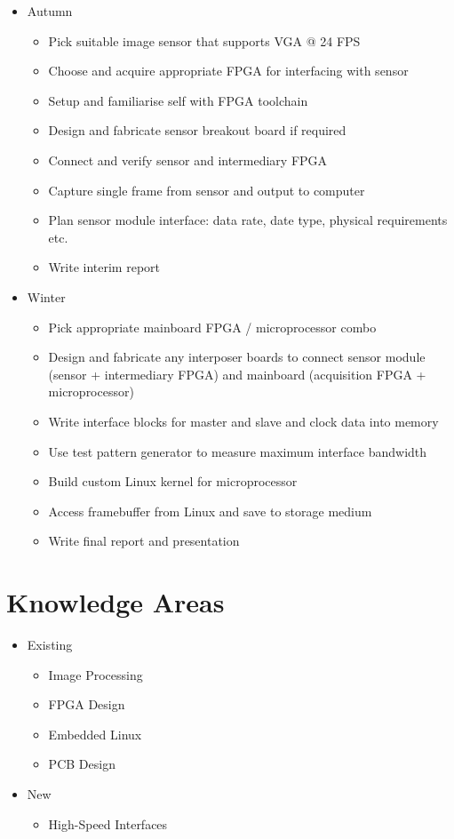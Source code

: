 \documentclass[a4paper]{article}
\begin{document}
\begin{itemize}
    \item Autumn
    \begin{itemize}
        \item Pick suitable image sensor that supports VGA @ 24 FPS
        \item Choose and acquire appropriate FPGA for interfacing with sensor
        \item Setup and familiarise self with FPGA toolchain
        \item Design and fabricate sensor breakout board if required
        \item Connect and verify sensor and intermediary FPGA
        \item Capture single frame from sensor and output to computer
        \item Plan sensor module interface: data rate, date type, physical requirements etc.
        \item Write interim report
    \end{itemize}
    \item Winter
    \begin{itemize}
        \item Pick appropriate mainboard FPGA / microprocessor combo
        \item Design and fabricate any interposer boards to connect sensor module (sensor + intermediary FPGA) and mainboard (acquisition FPGA + microprocessor)
        \item Write interface blocks for master and slave and clock data into memory
        \item Use test pattern generator to measure maximum interface bandwidth
        \item Build custom Linux kernel for microprocessor
        \item Access framebuffer from Linux and save to storage medium
        \item Write final report and presentation
    \end{itemize}
\end{itemize}

\section{Knowledge Areas}

\begin{itemize}
    \item Existing
    \begin{itemize}
        \item Image Processing
        \item FPGA Design
        \item Embedded Linux
        \item PCB Design
    \end{itemize}
    \item{New}
    \begin{itemize}
        \item High-Speed Interfaces
    \end{itemize}
\end{itemize}
\end{document}
